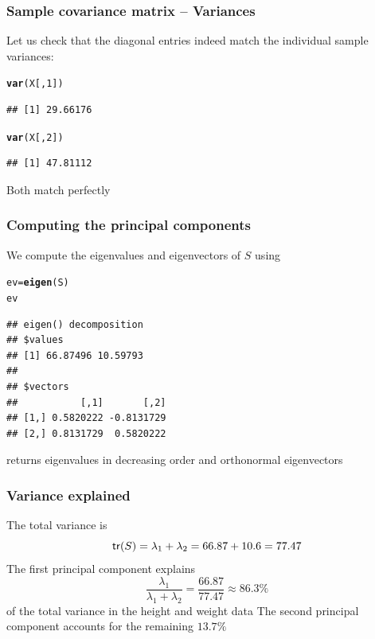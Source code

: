 \documentclass[aspectratio=169]{beamer}\usepackage[]{graphicx}\usepackage[]{xcolor}
\makeatletter
\newcommand{\hlnum}[1]{\textcolor[rgb]{0.686,0.059,0.569}{#1}}%
\newcommand{\hldef}[1]{\textcolor[rgb]{0.345,0.345,0.345}{#1}}%
\newcommand{\hlkwb}[1]{\textcolor[rgb]{0.69,0.353,0.396}{#1}}%
\newcommand{\hlkwd}[1]{\textcolor[rgb]{0.737,0.353,0.396}{\textbf{#1}}}%
\newenvironment{kframe}{%
 \def\at@end@of@kframe{}%
 \ifinner\ifhmode%
  \def\at@end@of@kframe{\end{minipage}}%
  \begin{minipage}{\columnwidth}%
 \fi\fi%
 \def\FrameCommand##1{\hskip\@totalleftmargin \hskip-\fboxsep
 \colorbox{shadecolor}{##1}\hskip-\fboxsep
     \hskip-\linewidth \hskip-\@totalleftmargin \hskip\columnwidth}%
 \MakeFramed {\advance\hsize-\width
   \@totalleftmargin\z@ \linewidth\hsize
   \@setminipage}}%
 {\par\unskip\endMakeFramed%
 \at@end@of@kframe}
\newenvironment{knitrout}{}{} %
\makeatother
\begin{document}
\begin{frame}[fragile]\frametitle{Sample covariance matrix -- Variances}
Let us check that the diagonal entries indeed match the individual sample variances:
\vfill
\begin{knitrout}
\color{fgcolor}\begin{kframe}
\begin{alltt}
\hlkwd{var}\hldef{(X[,} \hlnum{1}\hldef{])}
\end{alltt}
\begin{verbatim}
## [1] 29.66176
\end{verbatim}
\begin{alltt}
\hlkwd{var}\hldef{(X[,} \hlnum{2}\hldef{])}
\end{alltt}
\begin{verbatim}
## [1] 47.81112
\end{verbatim}
\end{kframe}
\end{knitrout}
\vfill
Both match perfectly
\end{frame}


\begin{frame}[fragile]\frametitle{Computing the principal components}
We compute the eigenvalues and eigenvectors of $S$ using 
\vfill
\begin{knitrout}
\color{fgcolor}\begin{kframe}
\begin{alltt}
\hldef{ev} \hlkwb{=} \hlkwd{eigen}\hldef{(S)}
\hldef{ev}
\end{alltt}
\begin{verbatim}
## eigen() decomposition
## $values
## [1] 66.87496 10.59793
## 
## $vectors
##           [,1]       [,2]
## [1,] 0.5820222 -0.8131729
## [2,] 0.8131729  0.5820222
\end{verbatim}
\end{kframe}
\end{knitrout}
\vfill
{} returns eigenvalues in decreasing order and orthonormal eigenvectors
\end{frame}


\begin{frame}\frametitle{Variance explained}
The total variance is
\[
\mathsf{tr}(S) = \lambda_1 + \lambda_2 = 66.87 + 10.6 = 77.47
\]
\vfill
The first principal component explains
\[
\frac{\lambda_1}{\lambda_1+\lambda_2} = \frac{66.87}{77.47} \approx 86.3\%
\]
of the total variance in the height and weight data
\vfill
The second principal component accounts for the remaining $13.7\%$
\end{frame}
\end{document}
